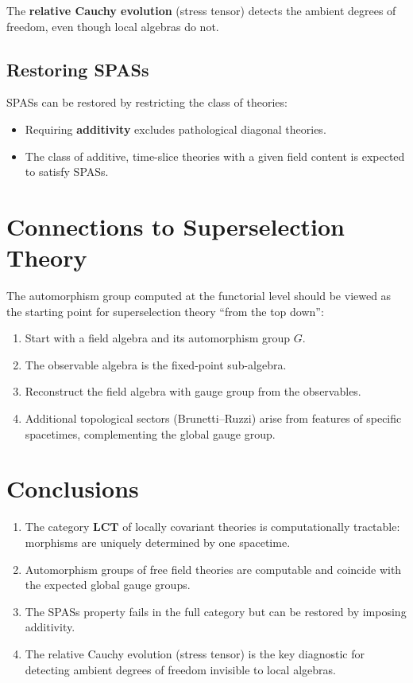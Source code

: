 \documentclass[11pt,a4paper]{article}
\begin{document}
The \textbf{relative Cauchy evolution} (stress tensor) detects the ambient
degrees of freedom, even though local algebras do not.

\subsection{Restoring SPASs}

SPASs can be restored by restricting the class of theories:
\begin{itemize}[nosep]
  \item Requiring \textbf{additivity} excludes pathological diagonal theories.
  \item The class of additive, time-slice theories with a given field content
        is expected to satisfy SPASs.
\end{itemize}

\section{Connections to Superselection Theory}

The automorphism group computed at the functorial level should be viewed as
the starting point for superselection theory ``from the top down'':
\begin{enumerate}[nosep]
  \item Start with a field algebra and its automorphism group $G$.
  \item The observable algebra is the fixed-point sub-algebra.
  \item Reconstruct the field algebra with gauge group from the observables.
  \item Additional topological sectors (Brunetti--Ruzzi) arise from features
        of specific spacetimes, complementing the global gauge group.
\end{enumerate}

\section{Conclusions}

\begin{enumerate}[nosep]
  \item The category $\mathbf{LCT}$ of locally covariant theories is
        computationally tractable: morphisms are uniquely determined by
        one spacetime.
  \item Automorphism groups of free field theories are computable and
        coincide with the expected global gauge groups.
  \item The SPASs property fails in the full category but can be restored
        by imposing additivity.
  \item The relative Cauchy evolution (stress tensor) is the key diagnostic
        for detecting ambient degrees of freedom invisible to local algebras.
\end{enumerate}
\end{document}
